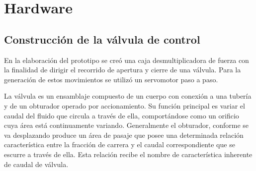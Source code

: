 \section{Hardware}
\subsection{Construcción de la válvula de control}
\label{subsec:Construcción de la válvula de control}

En la elaboración del prototipo se creó una caja desmultiplicadora de fuerza con la finalidad de dirigir el recorrido de apertura y cierre de una válvula. Para la generación de estos movimientos se utilizó un servomotor paso a paso.

La válvula es un ensamblaje compuesto de un cuerpo con conexión a una tubería y de un obturador operado por accionamiento. Su función principal es variar el caudal del fluido que circula a través de ella, comportándose como un orificio cuya área está continuamente variando. 
Generalmente el obturador, conforme se va desplazando produce un área de pasaje que posee una determinada relación característica entre la fracción de carrera y el caudal correspondiente que se escurre a través de ella. Esta relación recibe el nombre de característica inherente de caudal de válvula.

